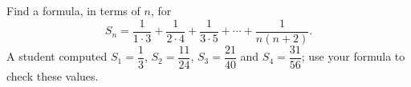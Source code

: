 Find a formula, in terms of $n$, for
\[S_n=\dfrac{1}{1\cdot3}+\dfrac{1}{2\cdot4}+\dfrac{1}{3\cdot5}+\cdots+\dfrac{1}{n(n+2)}.\]
A student computed $S_1=\dfrac13$, $S_2=\dfrac{11}{24}$, $S_3=\dfrac{21}{40}$ and $S_4=\dfrac{31}{56}$; use your formula to check these values.
